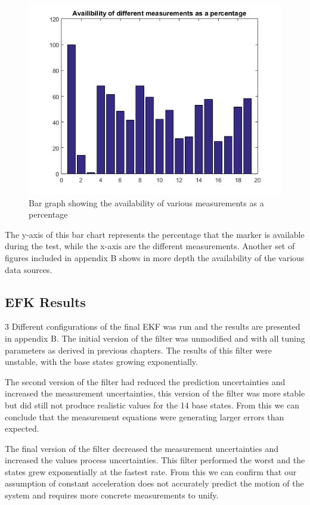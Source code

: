 \begin{figure}[!ht] 
\captionsetup{width=0.8\linewidth, font=small}  
\includegraphics[width=0.75\linewidth]{figures/hist.jpg}
\caption{Bar graph showing the availability of various measurements as a percentage}
\label{fig:hist}
\end{figure}

The y-axis of this bar chart represents the percentage that the marker is available during the test, while the x-axis are the different measurements. Another set of figures included in appendix B shows in more depth the availability of the various data sources.


\subsection{EFK Results}
3 Different configurations of the final EKF was run and the results are presented in appendix B. The initial version of the filter was unmodified and with all tuning parameters as derived in previous chapters. The results of this filter were unstable, with the base states growing exponentially.

The second version of the filter had reduced the prediction uncertainties and increased the measurement uncertainties, this version of the filter was more stable but did still not produce realistic values for the 14 base states. From this we can conclude that the measurement equations were generating larger errors than expected.

The final version of the filter decreased the measurement uncertainties and increased the values process uncertainties. This filter performed the worst and the states grew exponentially at the fastest rate. From this we can confirm that our assumption of constant acceleration does not accurately predict the motion of the system and requires more concrete measurements to unify.

